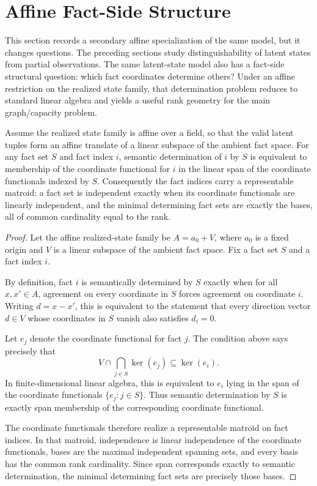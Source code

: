 \section{Affine Fact-Side Structure}\label{sec:affine}


This section records a secondary affine specialization of the same model, but it changes questions. The preceding sections study distinguishability of latent states from partial observations. The same latent-state model also has a fact-side structural question: which fact coordinates determine others? Under an affine restriction on the realized state family, that determination problem reduces to standard linear algebra and yields a useful rank geometry for the main graph/capacity problem.

\begin{proposition}\label{thm:affine-fact-matroid}
Assume the realized state family is affine over a field, so that the valid latent tuples form an affine translate of a linear subspace of the ambient fact space. For any fact set $S$ and fact index $i$, semantic determination of $i$ by $S$ is equivalent to membership of the coordinate functional for $i$ in the linear span of the coordinate functionals indexed by $S$. Consequently the fact indices carry a representable matroid: a fact set is independent exactly when its coordinate functionals are linearly independent, and the minimal determining fact sets are exactly the bases, all of common cardinality equal to the rank.
\end{proposition}

\begin{proof}
Let the affine realized-state family be $A=a_0+V$, where $a_0$ is a fixed origin and $V$ is a linear subspace of the ambient fact space. Fix a fact set $S$ and a fact index $i$.

By definition, fact $i$ is semantically determined by $S$ exactly when for all $x,x'\in A$, agreement on every coordinate in $S$ forces agreement on coordinate $i$. Writing $d=x-x'$, this is equivalent to the statement that every direction vector $d\in V$ whose coordinates in $S$ vanish also satisfies $d_i=0$.

Let $e_j$ denote the coordinate functional for fact $j$. The condition above says precisely that
\[
V\cap \bigcap_{j\in S}\ker(e_j)\subseteq \ker(e_i).
\]
In finite-dimensional linear algebra, this is equivalent to $e_i$ lying in the span of the coordinate functionals $\{e_j:j\in S\}$. Thus semantic determination by $S$ is exactly span membership of the corresponding coordinate functional.

The coordinate functionals therefore realize a representable matroid on fact indices. In that matroid, independence is linear independence of the coordinate functionals, bases are the maximal independent spanning sets, and every basis has the common rank cardinality. Since span corresponds exactly to semantic determination, the minimal determining fact sets are precisely those bases.
\end{proof}


